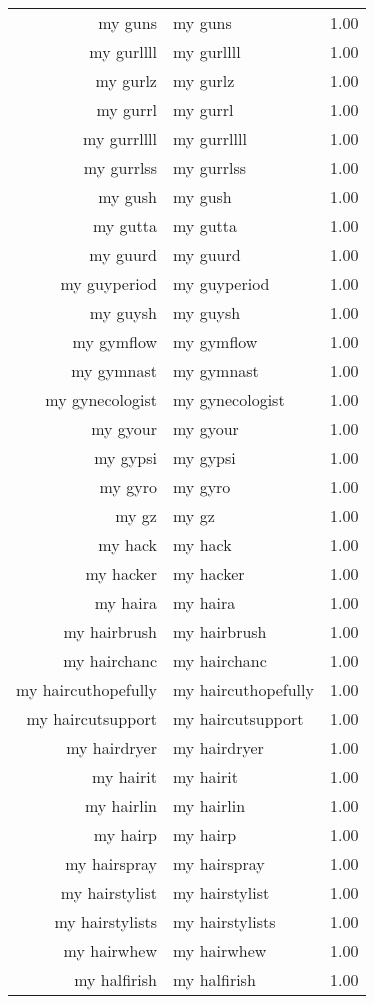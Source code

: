 \begin{table}[ht]
\begin{tabular}{rlr}
  my guns & my guns & 1.00 \\ 
  my gurllll & my gurllll & 1.00 \\ 
  my gurlz & my gurlz & 1.00 \\ 
  my gurrl & my gurrl & 1.00 \\ 
  my gurrllll & my gurrllll & 1.00 \\ 
  my gurrlss & my gurrlss & 1.00 \\ 
  my gush & my gush & 1.00 \\ 
  my gutta & my gutta & 1.00 \\ 
  my guurd & my guurd & 1.00 \\ 
  my guyperiod & my guyperiod & 1.00 \\ 
  my guysh & my guysh & 1.00 \\ 
  my gymflow & my gymflow & 1.00 \\ 
  my gymnast & my gymnast & 1.00 \\ 
  my gynecologist & my gynecologist & 1.00 \\ 
  my gyour & my gyour & 1.00 \\ 
  my gypsi & my gypsi & 1.00 \\ 
  my gyro & my gyro & 1.00 \\ 
  my gz & my gz & 1.00 \\ 
  my hack & my hack & 1.00 \\ 
  my hacker & my hacker & 1.00 \\ 
  my haira & my haira & 1.00 \\ 
  my hairbrush & my hairbrush & 1.00 \\ 
  my hairchanc & my hairchanc & 1.00 \\ 
  my haircuthopefully & my haircuthopefully & 1.00 \\ 
  my haircutsupport & my haircutsupport & 1.00 \\ 
  my hairdryer & my hairdryer & 1.00 \\ 
  my hairit & my hairit & 1.00 \\ 
  my hairlin & my hairlin & 1.00 \\ 
  my hairp & my hairp & 1.00 \\ 
  my hairspray & my hairspray & 1.00 \\ 
  my hairstylist & my hairstylist & 1.00 \\ 
  my hairstylists & my hairstylists & 1.00 \\ 
  my hairwhew & my hairwhew & 1.00 \\ 
  my halfirish & my halfirish & 1.00 \\ 

\end{tabular}
\end{table}
